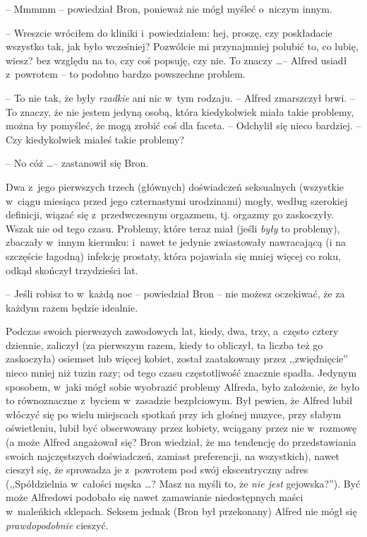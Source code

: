 \documentclass[oneside,polish,11pt,rmheadings]{mwbk}
\begin{document}
-- Mmmmm -- powiedział Bron, ponieważ nie mógł myśleć o~niczym innym. 

-- Wreszcie wróciłem do kliniki i~powiedziałem: hej, proszę, czy poskładacie wszystko tak, jak było wcześniej? Pozwólcie mi przynajmniej polubić to, co lubię, wiesz? bez względu na to, czy coś popsuję, czy nie. To znaczy \ldots  -- Alfred usiadł z~powrotem -- to podobno bardzo powszechne problem. 

--  To nie tak, że były  \textit{rzadkie } ani nic w~tym rodzaju. -- Alfred zmarszczył brwi.  -- To znaczy, że nie jestem jedyną osobą, która kiedykolwiek miała takie problemy, można by pomyśleć, że mogą zrobić coś dla faceta. -- Odchylił się nieco bardziej. -- Czy kiedykolwiek miałeś takie problemy? 

-- No cóż \ldots  -- zastanowił się Bron.  

Dwa z~jego pierwszych trzech (głównych) doświadczeń seksualnych (wszystkie w~ciągu miesiąca przed jego czternastymi urodzinami) mogły, według szerokiej definicji, wiązać się z~przedwczesnym orgazmem, tj. orgazmy go zaskoczyły. Wszak nie od tego czasu. Problemy, które teraz miał (jeśli \textit{były } to problemy), zbaczały w~innym kierunku: i~nawet te jedynie zwiastowały nawracającą (i na szczęście łagodną) infekcję prostaty, która pojawiała się mniej więcej co roku, odkąd skończył trzydzieści lat. 

-- Jeśli robisz to w~każdą noc -- powiedział Bron -- nie możesz oczekiwać, że za każdym razem będzie idealnie. 

Podczas swoich pierwszych zawodowych lat, kiedy, dwa, trzy, a~często cztery dziennie, zaliczył (za pierwszym razem, kiedy to obliczył, ta liczba też go zaskoczyła) osiemset lub więcej kobiet, został zaatakowany przez ,,zwiędnięcie'' nieco mniej niż tuzin razy; od tego czasu częstotliwość znacznie spadła. Jedynym sposobem, w~jaki mógł sobie wyobrazić problemy Alfreda, było założenie, że było to równoznaczne z~byciem w~zasadzie bezpłciowym. Był pewien, że Alfred lubił włóczyć się po wielu miejscach spotkań przy ich głośnej muzyce, przy słabym oświetleniu, lubił być obserwowany przez kobiety, wciągany przez nie w~rozmowę (a może Alfred angażował się? Bron wiedział, że ma tendencję do przedstawiania swoich najczęstszych doświadczeń, zamiast preferencji, na wszystkich), nawet cieszył się, że sprowadza je z~powrotem pod swój ekscentryczny adres (,,Spółdzielnia w~całości męska \ldots ? Masz na myśli to, że \textit{nie jest }gejowska?''). Być może Alfredowi podobało się nawet zamawianie niedostępnych maści w~maleńkich sklepach. Seksem jednak (Bron był przekonany) Alfred nie mógł się \textit{prawdopodobnie } cieszyć. 
\end{document}

